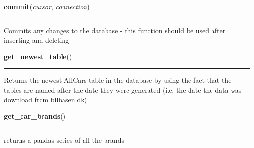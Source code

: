     \label{BilbasenDataMining:database:commit}

    \vspace{0.5ex}

\hspace{.8\funcindent}\begin{boxedminipage}{\funcwidth}

    \raggedright \textbf{commit}(\textit{cursor}, \textit{connection})

    \vspace{-1.5ex}

    \rule{\textwidth}{0.5\fboxrule}
\setlength{\parskip}{2ex}
    Commits any changes to the database - this function should be used 
    after inserting and deleting

\setlength{\parskip}{1ex}
    \end{boxedminipage}

    \label{BilbasenDataMining:database:get_newest_table}

    \vspace{0.5ex}

\hspace{.8\funcindent}\begin{boxedminipage}{\funcwidth}

    \raggedright \textbf{get\_newest\_table}()

    \vspace{-1.5ex}

    \rule{\textwidth}{0.5\fboxrule}
\setlength{\parskip}{2ex}
    Returns the newest AllCars-table in the database by using the fact that
    the tables are named after the date they were generated (i.e. the date 
    the data was download from bilbasen.dk)

\setlength{\parskip}{1ex}
    \end{boxedminipage}

    \label{BilbasenDataMining:database:get_car_brands}

    \vspace{0.5ex}

\hspace{.8\funcindent}\begin{boxedminipage}{\funcwidth}

    \raggedright \textbf{get\_car\_brands}()

    \vspace{-1.5ex}

    \rule{\textwidth}{0.5\fboxrule}
\setlength{\parskip}{2ex}
    returns a pandas series of all the brands

\setlength{\parskip}{1ex}
    \end{boxedminipage}

